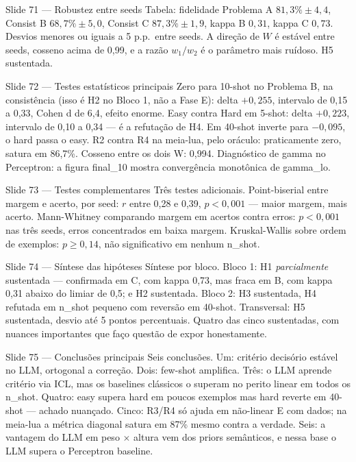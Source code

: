 \documentclass[aspectratio=169,10pt]{beamer}
\begin{document}
\begin{frame}{Slide 71 --- Robustez entre seeds}
\footnotesize
Tabela: fidelidade Problema A $81{,}3\% \pm 4{,}4$, Consist B $68{,}7\% \pm 5{,}0$, Consist C $87{,}3\% \pm 1{,}9$, kappa B $0{,}31$, kappa C $0{,}73$. Desvios menores ou iguais a 5 p.p.\ entre seeds. A dire\c{c}\~ao de $W$ \'e est\'avel entre seeds, cosseno acima de 0,99, e a raz\~ao $w_1/w_2$ \'e o par\^ametro mais ru\'idoso. H5 sustentada.
\end{frame}

\begin{frame}{Slide 72 --- Testes estat\'isticos principais}
\footnotesize
Zero para 10-shot no Problema B, na consist\^encia (isso \'e H2 no Bloco 1, n\~ao a Fase E): delta $+0{,}255$, intervalo de 0,15 a 0,33, Cohen d de 6,4, efeito enorme. Easy contra Hard em 5-shot: delta $+0{,}223$, intervalo de 0,10 a 0,34 --- \'e a refuta\c{c}\~ao de H4. Em 40-shot inverte para $-0{,}095$, o hard passa o easy. R2 contra R4 na meia-lua, pelo or\'aculo: praticamente zero, satura em 86,7\%. Cosseno entre os dois W: 0,994. Diagn\'ostico de gamma no Perceptron: a figura final\_10 mostra converg\^encia monot\^onica de gamma\_lo.
\end{frame}

\begin{frame}{Slide 73 --- Testes complementares}
\footnotesize
Tr\^es testes adicionais. Point-biserial entre margem e acerto, por seed: $r$ entre 0,28 e 0,39, $p<0{,}001$ --- maior margem, mais acerto. Mann-Whitney comparando margem em acertos contra erros: $p<0{,}001$ nas tr\^es seeds, erros concentrados em baixa margem. Kruskal-Wallis sobre ordem de exemplos: $p \geq 0{,}14$, n\~ao significativo em nenhum n\_shot.
\end{frame}

\begin{frame}{Slide 74 --- S\'intese das hip\'oteses}
\footnotesize
S\'intese por bloco. Bloco 1: H1 \emph{parcialmente} sustentada --- confirmada em C, com kappa 0,73, mas fraca em B, com kappa 0,31 abaixo do limiar de 0,5; e H2 sustentada. Bloco 2: H3 sustentada, H4 refutada em n\_shot pequeno com revers\~ao em 40-shot. Transversal: H5 sustentada, desvio at\'e 5 pontos percentuais. Quatro das cinco sustentadas, com nuances importantes que fa\c{c}o quest\~ao de expor honestamente.
\end{frame}

\begin{frame}{Slide 75 --- Conclus\~oes principais}
\footnotesize
Seis conclus\~oes. Um: crit\'erio decis\'orio est\'avel no LLM, ortogonal a corre\c{c}\~ao. Dois: few-shot amplifica. Tr\^es: o LLM aprende crit\'erio via ICL, mas os baselines cl\'assicos o superam no perito linear em todos os n\_shot. Quatro: easy supera hard em poucos exemplos mas hard reverte em 40-shot --- achado nuan\c{c}ado. Cinco: R3/R4 s\'o ajuda em n\~ao-linear E com dados; na meia-lua a m\'etrica diagonal satura em 87\% mesmo contra a verdade. Seis: a vantagem do LLM em peso $\times$ altura vem dos priors sem\^anticos, e nessa base o LLM supera o Perceptron baseline.
\end{frame}
\end{document}

